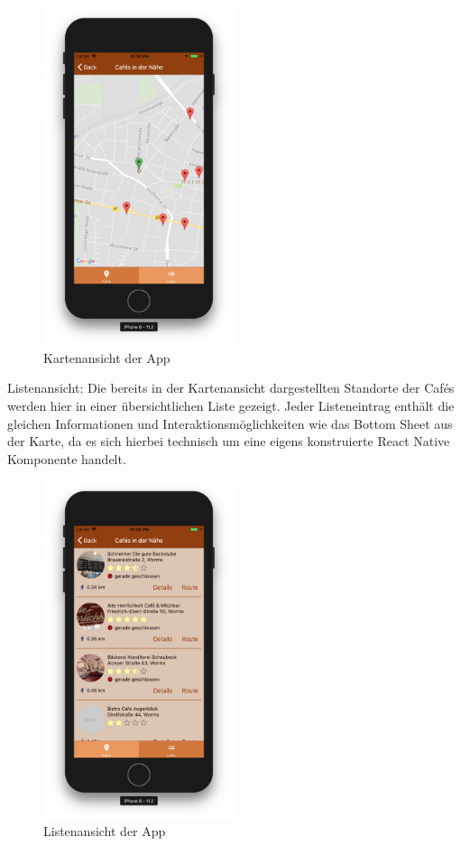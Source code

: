 \begin{figure}[H]
    \centering
		\includegraphics[width=0.5\textwidth]{Bilder/app-karte.png}
		\caption{Kartenansicht der App}
\end{figure}


Listenansicht:
Die bereits in der Kartenansicht dargestellten Standorte der Cafés werden hier in einer übersichtlichen Liste gezeigt.
Jeder Listeneintrag enthält die gleichen Informationen und Interaktionsmöglichkeiten wie das Bottom Sheet aus der Karte, da es sich hierbei technisch um eine eigens konstruierte React Native Komponente handelt.

\begin{figure}[H]
    \centering
		\includegraphics[width=0.5\textwidth]{Bilder/app-liste.png}
		\caption{Listenansicht der App}
\end{figure}


